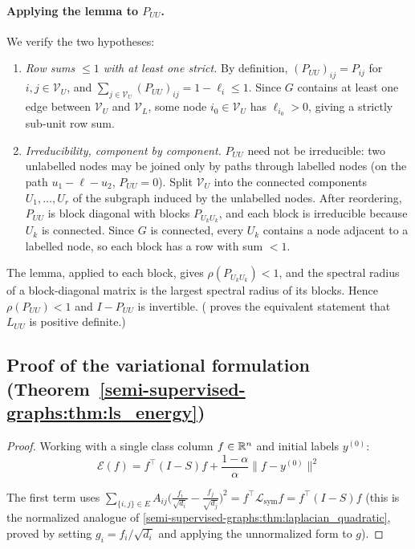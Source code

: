 \begin{notechapter}
\paragraph{Applying the lemma to $P_{UU}$.}
We verify the two hypotheses:
\begin{enumerate}
  \item \emph{Row sums $\leq 1$ with at least one strict.}
    By definition, $(P_{UU})_{ij} = P_{ij}$ for $i,j \in \mathcal{V}_U$, and
    $\sum_{j \in \mathcal{V}_U}(P_{UU})_{ij} = 1 - \ell_i \leq 1$.  Since $G$
    contains at least one edge between $\mathcal{V}_U$ and $\mathcal{V}_L$,
    some node $i_0 \in \mathcal{V}_U$ has $\ell_{i_0} > 0$, giving a strictly
    sub-unit row sum.
  \item \emph{Irreducibility, component by component.}
    $P_{UU}$ need not be irreducible: two unlabelled nodes may be joined only by paths through labelled nodes (on the path $u_1 - \ell - u_2$, $P_{UU} = 0$). Split $\mathcal V_U$ into the connected components $U_1, \ldots, U_r$ of the subgraph induced by the unlabelled nodes. After reordering, $P_{UU}$ is block diagonal with blocks $P_{U_kU_k}$, and each block is irreducible because $U_k$ is connected. Since $G$ is connected, every $U_k$ contains a node adjacent to a labelled node, so each block has a row with sum $< 1$.
\end{enumerate}
The lemma, applied to each block, gives $\rho(P_{U_kU_k}) < 1$, and the spectral radius of a block-diagonal matrix is the largest spectral radius of its blocks. Hence $\rho(P_{UU}) < 1$ and $I - P_{UU}$ is invertible. ( proves the equivalent statement that $L_{UU}$ is positive definite.)


\subsection{Proof of the variational formulation (Theorem~\ref{semi-supervised-graphs:thm:ls_energy})}
\label{semi-supervised-graphs:app:ls_energy}

\begin{proof}
Working with a single class column $f \in \mathbb{R}^n$ and initial labels
$y^{(0)}$:
\begin{equation}
\mathcal{E}(f) = f^\top(I - S)f + \frac{1-\alpha}{\alpha}\|f - y^{(0)}\|^2
\end{equation}

The first term uses $\sum_{\{i,j\}\in E}A_{ij}\bigl(\frac{f_i}{\sqrt{d_i}} -
\frac{f_j}{\sqrt{d_j}}\bigr)^2 = f^\top\mathcal{L}_{\mathrm{sym}}f
= f^\top(I-S)f$ (this is the normalized analogue of
\cref{semi-supervised-graphs:thm:laplacian_quadratic}, proved by setting $g_i = f_i/\sqrt{d_i}$
and applying the unnormalized form to $g$).


\end{proof}
\end{notechapter}
